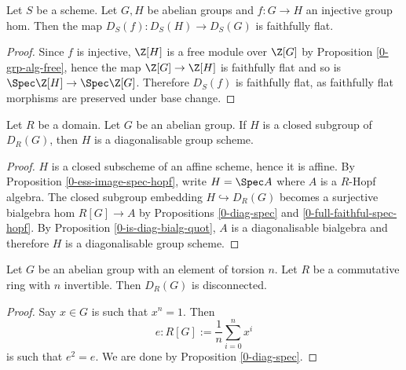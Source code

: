 \begin{proposition}
  \label{0-diag-faithful-flat}

  Let $S$ be a scheme.
  Let $G, H$ be abelian groups and $f : G \to H$ an injective group hom.
  Then the map $D_S(f) : D_S(H) \to D_S(G)$ is faithfully flat.
\end{proposition}
\begin{proof}

  Since $f$ is injective, $\Z[H]$ is a free module over $\Z[G]$ by Proposition \ref{0-grp-alg-free},
  hence the map $\Z[G] \to \Z[H]$ is faithfully flat and so is $\Spec \Z[H] \to \Spec \Z[G]$.
  Therefore $D_S(f)$ is faithfully flat,
  as faithfully flat morphisms are preserved under base change.
\end{proof}


\begin{proposition}
  \label{0-subgroup-diag}

  Let $R$ be a domain. Let $G$ be an abelian group.
  If $H$ is a closed subgroup of $D_R(G)$, then $H$ is a diagonalisable group scheme.
\end{proposition}
\begin{proof}

  $H$ is a closed subscheme of an affine scheme, hence it is affine.
  By Proposition \ref{0-ess-image-spec-hopf}, write $H = \Spec A$ where $A$ is a $R$-Hopf algebra.
  The closed subgroup embedding $H \hookrightarrow D_R(G)$
  becomes a surjective bialgebra hom $R[G] \to A$ by
  Propositions \ref{0-diag-spec} and \ref{0-full-faithful-spec-hopf}.
  By Proposition \ref{0-is-diag-bialg-quot},
  $A$ is a diagonalisable bialgebra and therefore $H$ is a diagonalisable group scheme.
\end{proof}


\begin{proposition}
  \label{0-diag-tors}

  Let $G$ be an abelian group with an element of torsion $n$.
  Let $R$ be a commutative ring with $n$ invertible.
  Then $D_R(G)$ is disconnected.
\end{proposition}
\begin{proof}

  Say $x \in G$ is such that $x^n = 1$. Then
  \[e : R[G] := \frac 1n \sum_{i = 0}^n x^i\]
  is such that $e ^ 2 = e$.
  We are done by Proposition \ref{0-diag-spec}.
\end{proof}
